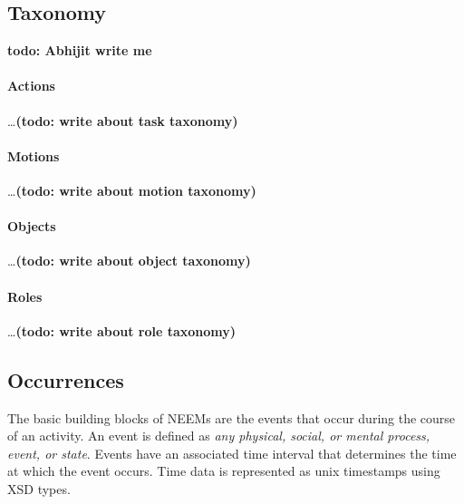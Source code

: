 \subsection{Taxonomy}
\label{sec:taxonomy}
\textbf{todo: Abhijit write me}

\paragraph{Actions} \dots \textbf{(todo: write about task taxonomy)}
\paragraph{Motions} \dots \textbf{(todo: write about motion taxonomy)}
\paragraph{Objects} \dots \textbf{(todo: write about object taxonomy)}
\paragraph{Roles} \dots \textbf{(todo: write about role taxonomy)}

\subsection{Occurrences}
\label{sec:occurrences}
The basic building blocks of NEEMs are the events that occur during the course of an activity. An event is defined as \emph{any physical, social, or mental process, event, or state}. Events have an associated time interval that determines the time at which the event occurs. Time data is represented as unix timestamps using XSD types.

